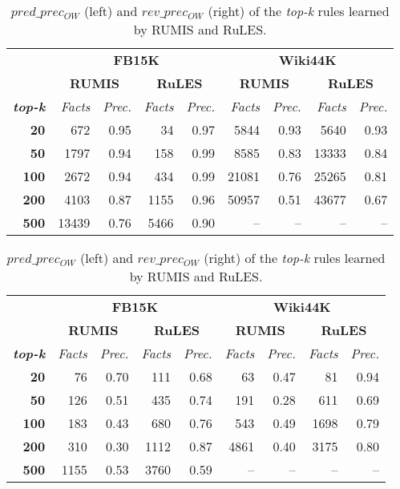 \begin{table}[t]
\scriptsize
\centering
\begin{tabular}{r | r r| r r | r r |r r}
 & \multicolumn{4}{c}{\textbf{FB15K}} & \multicolumn{4}{|c}{\textbf{Wiki44K}} \\
 \cmidrule{2-9}&\multicolumn{2}{c}{\textbf{RUMIS}}&\multicolumn{2}{|c}{\textbf{RuLES}}&\multicolumn{2}{|c}{\textbf{RUMIS}}&\multicolumn{2}{|c}{\textbf{RuLES}} \\
\textbf{\textit{top-k}} & \emph{Facts} & \emph{Prec.} & \emph{Facts} & \emph{Prec.} & \emph{Facts} & \emph{Prec.}& \emph{Facts} & \emph{Prec.} \\
 \midrule
\textbf{20} & 672 & 0.95 & 34 & 0.97 & 5844 & 0.93 & 5640 & 0.93 \\
\textbf{50} & 1797 & 0.94 & 158 & 0.99 & 8585 & 0.83 & 13333 & 0.84 \\
\textbf{100} & 2672 & 0.94 & 434 & 0.99 & 21081 & 0.76 & 25265 & 0.81 \\
\textbf{200} & 4103 & 0.87 & 1155 & 0.96 & 50957 & 0.51 & 43677 & 0.67 \\
\textbf{500} & 13439 & 0.76 & 5466 & 0.90 & -- & -- & -- & -- \\
\bottomrule
\end{tabular}
%
\qquad
%
\begin{tabular}{r | r r| r r | r r |r r}
 & \multicolumn{4}{c}{\textbf{FB15K}} & \multicolumn{4}{|c}{\textbf{Wiki44K}} \\
 \cmidrule{2-9}&\multicolumn{2}{c}{\textbf{RUMIS}}&\multicolumn{2}{|c}{\textbf{RuLES}}&\multicolumn{2}{|c}{\textbf{RUMIS}}&\multicolumn{2}{|c}{\textbf{RuLES}} \\
\textbf{\textit{top-k}} & \emph{Facts} & \emph{Prec.} & \emph{Facts} & \emph{Prec.} & \emph{Facts} & \emph{Prec.}& \emph{Facts} & \emph{Prec.} \\
 \midrule
\textbf{20} & 76 & 0.70 & 111 & 0.68 & 63 & 0.47 & 81 & 0.94 \\
\textbf{50} & 126 & 0.51 & 435 & 0.74 & 191 & 0.28 & 611 & 0.69 \\
\textbf{100} & 183 & 0.43 & 680 & 0.76 & 543 & 0.49 & 1698 & 0.79 \\
\textbf{200} & 310 & 0.30 & 1112 & 0.87 & 4861 & 0.40 & 3175 & 0.80 \\
\textbf{500} & 1155 & 0.53 & 3760 & 0.59 & -- & -- & -- & -- \\
\bottomrule
\end{tabular}

\caption{$pred\_prec_{OW}$ (left) and $rev\_prec_{OW}$ (right)
of the \textit{top-k} rules learned by RUMIS and RuLES.}
\label{table:exception_prediction_result}
\vspace*{-3mm}
\end{table}